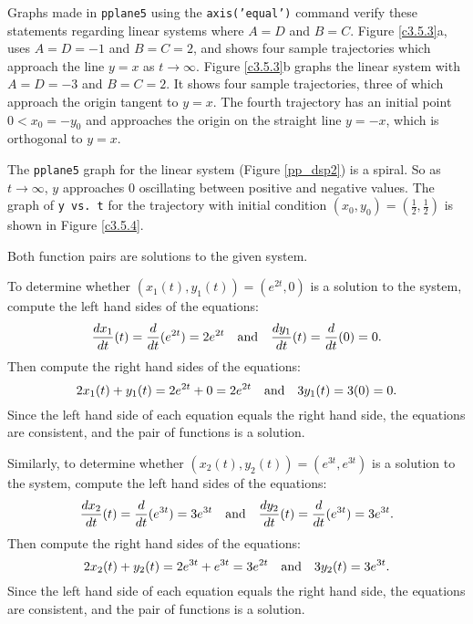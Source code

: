 Graphs made in {\tt pplane5} using the {\tt axis('equal')} command
verify these statements regarding linear systems where $A = D$
and $B = C$.  Figure \ref{c3.5.3}a, uses $A = D = -1$ and
$B = C = 2$, and shows four sample trajectories which approach
the line $y = x$ as $t \rightarrow \infty$.  Figure
\ref{c3.5.3}b graphs the linear system with $A = D = -3$
and $B = C = 2$.  It shows four sample trajectories, three of
which approach the origin tangent to $y = x$.  The fourth
trajectory has an initial point $0 < x_0 = -y_0$ and approaches
the origin on the straight line $y = -x$, which is orthogonal
to $y = x$.
\begin{figure}[htb]
                       \centerline{%
                       }
\end{figure}

The {\tt pplane5} graph for the linear system (Figure \ref{pp_dsp2}) is
a spiral.  So as $t \rightarrow \infty$, $y$ approaches $0$ oscillating
between positive and negative values.  The graph of {\tt y vs.\ t} for the
trajectory with initial condition $(x_0,y_0) = \left(\frac{1}{2},
\frac{1}{2}\right)$ is shown in Figure \ref{c3.5.4}.

\begin{figure}[htb]
                       \centerline{%
                       }
\end{figure}

 \ans Both function pairs are solutions to the given system.

\soln To determine whether $(x_1(t),y_1(t)) = (e^{2t},0)$ is
a solution to the system, compute the left hand sides of the equations:
\[
\frac{dx_1}{dt}(t) = \frac{d}{dt}(e^{2t}) = 2e^{2t} \quad\mbox{and}\quad
\frac{dy_1}{dt}(t) = \frac{d}{dt}(0) = 0.
\]
Then compute the right hand sides of the equations:
\[
2x_1(t) + y_1(t) = 2e^{2t} + 0 = 2e^{2t} \quad\mbox{and}\quad
3y_1(t) = 3(0) = 0.
\]
Since the left hand side of each equation equals the right hand side, the
equations are consistent, and the pair of functions is a solution.

\para Similarly, to determine whether $(x_2(t),y_2(t)) = (e^{3t},e^{3t})$
is a solution to the system, compute the left hand sides of the equations:
\[
\frac{dx_2}{dt}(t) = \frac{d}{dt}(e^{3t}) = 3e^{3t} \quad\mbox{and}\quad
\frac{dy_2}{dt}(t) = \frac{d}{dt}(e^{3t}) = 3e^{3t}.
\]
Then compute the right hand sides of the equations:
\[
2x_2(t) + y_2(t) = 2e^{3t} + e^{3t} = 3e^{2t} \quad\mbox{and}\quad
3y_2(t) = 3e^{3t}.
\]
Since the left hand side of each equation equals the right hand side, the
equations are consistent, and the pair of functions is a solution.


